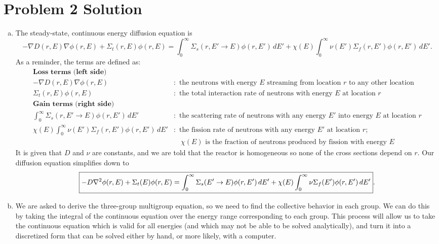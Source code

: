 \documentclass{report}
\begin{document}
\section*{Problem 2 Solution}

\begin{enumerate}[a)]

\item 

The steady-state, continuous energy diffusion equation is
$$ -\nabla D(r,E) \nabla \phi(r,E) + \Sigma_t(r,E) \phi(r,E) = \int_0^{\infty} \Sigma_s(r,E' \rightarrow E)\phi(r,E')\,dE' + \chi(E) \int_0^{\infty} \nu(E') \Sigma_f(r,E')\phi(r,E')\,dE' .$$
As a reminder, the terms are defined as:
\begin{align*}
\textbf{Loss terms (left side)} \qquad\qquad& \\
-\nabla D(r,E) \nabla \phi(r,E)&:\text{ the neutrons with energy }E\text{ streaming from location }r\text{ to any other location} \\
\Sigma_t(r,E) \phi(r,E)&:\text{ the total interaction rate of neutrons with energy }E\text{ at location }r  \\
\textbf{Gain terms (right side)} \qquad\qquad& \\
\int_0^{\infty} \Sigma_s(r,E' \rightarrow E)\phi(r,E')\,dE'&:\text{ the scattering rate of neutrons with any energy }E'\text{ into energy }E\text{ at location }r \\
\chi(E) \int_0^{\infty} \nu(E') \Sigma_f(r,E')\phi(r,E')\,dE'&:\text{ the fission rate of neutrons with any energy }E'\text{ at location }r; \\
& \quad\chi(E)\text{ is the fraction of neutrons produced by fission with energy }E
\end{align*}
It is given that $D$ and $\nu$ are constants, and we are told that the reactor is homogeneous so none of the cross sections depend on $r$. Our diffusion equation simplifies down to
$$\boxed{ -D \nabla^2 \phi(r,E) + \Sigma_t(E) \phi(r,E) = \int_0^{\infty} \Sigma_s(E' \rightarrow E)\phi(r,E')\,dE' + \chi(E) \int_0^{\infty} \nu \Sigma_f(E')\phi(r,E')\,dE' }.$$

\item

We are asked to derive the three-group multigroup equation, so we need to find the collective behavior in each group. We can do this by taking the integral of the continuous equation over the energy range corresponding to each group. This process will allow us to take the continuous equation which is valid for all energies (and which may not be able to be solved analytically), and turn it into a discretized form that can be solved either by hand, or more likely, with a computer.


\end{enumerate}
\end{document}
